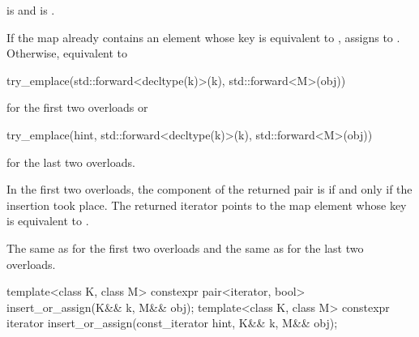 \begin{itemdescr}
\pnum
\constraints
{} is  and
 is .

\pnum
\effects
If the map already contains an element 
whose key is equivalent to ,
assigns  to .
Otherwise, equivalent to
\begin{codeblock}
try_emplace(std::forward<decltype(k)>(k), std::forward<M>(obj))
\end{codeblock}
for the first two overloads or
\begin{codeblock}
try_emplace(hint, std::forward<decltype(k)>(k), std::forward<M>(obj))
\end{codeblock}
for the last two overloads.

\pnum
\returns
In the first two overloads, the  component of the returned pair
is  if and only if the insertion took place.  The returned
iterator points to the map element whose key is equivalent to .

\pnum
\complexity
The same as  for the first two overloads and
the same as  for the last two overloads.
\end{itemdescr}

%
\begin{itemdecl}
template<class K, class M>
  constexpr pair<iterator, bool> insert_or_assign(K&& k, M&& obj);
template<class K, class M>
  constexpr iterator insert_or_assign(const_iterator hint, K&& k, M&& obj);
\end{itemdecl}


